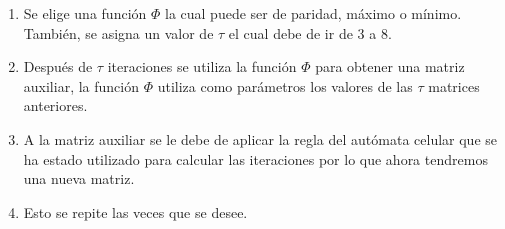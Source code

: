 	\begin{enumerate}
		\item Se elige una función $\Phi$ la cual puede ser de paridad, máximo o mínimo. También, se asigna un valor de $\tau$ el cual debe de ir de 3 a 8.
		\item Después de $\tau$ iteraciones se utiliza la función $\Phi$ para obtener una matriz auxiliar, la función $\Phi$ utiliza como parámetros los valores de las $\tau$ matrices anteriores.
		\item A la matriz auxiliar se le debe de aplicar la regla del autómata celular que se ha estado utilizado para calcular las iteraciones por lo que ahora tendremos una nueva matriz.
		\item Esto se repite las veces que se desee.
	\end{enumerate}